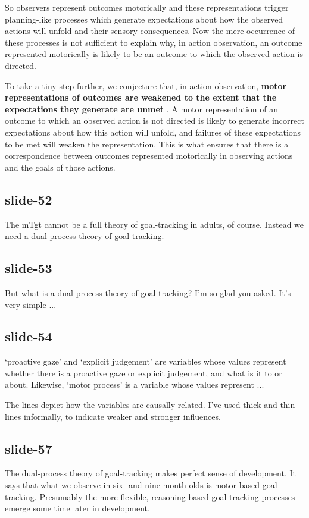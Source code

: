 \documentclass[12pt,\papersize]{extarticle}
\begin{document}
So observers represent outcomes motorically and these representations trigger planning-like processes
which generate expectations about how the observed actions will unfold and their sensory consequences.
Now the mere occurrence of these processes is not sufficient to explain why, in action observation,
an outcome represented motorically is likely to be an outcome to which the observed action is
directed.
 
To take a tiny step further, we conjecture that, in action observation, \textbf{motor representations of
outcomes are weakened to the extent that the expectations they generate are unmet}
\citep[compare][]{Fogassi:2005nf}.
A motor representation of an outcome to which an observed action is not directed is likely to
generate incorrect expectations about how this action will unfold, and failures of these
expectations to be met will weaken the representation.
This is what ensures that there is a correspondence between outcomes represented motorically in
observing actions and the goals of those actions.
 
\subsection{slide-52}
The mTgt cannot be a full theory of goal-tracking in adults, of course.
Instead we need a dual process theory of goal-tracking.
 
\subsection{slide-53}
But what is a dual process theory of goal-tracking?
I’m so glad you asked.
It’s very simple ...
 
\subsection{slide-54}
‘proactive gaze’ and ‘explicit judgement’ are variables whose values represent
whether there is a proactive gaze or explicit judgement, and what is it to or about.
Likewise, ‘motor process’ is a variable whose values represent ...
 
The lines depict how the variables are causally related. I’ve used thick and thin
lines informally, to indicate weaker and stronger influences.
 
\subsection{slide-57}
The dual-process theory of goal-tracking makes perfect sense of development.
It says that what we observe in six- and nine-month-olds is motor-based goal-tracking.
Presumably the more flexible, reasoning-based goal-tracking processes emerge some time
later in development.
 
\end{document}
